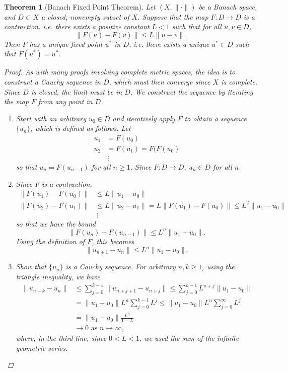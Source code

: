 \documentclass[12pt]{amsart}         %
\newtheorem{theorem}{Theorem}[section]
\theoremstyle{remark}
\begin{document}
\begin{theorem}[Banach Fixed Point Theorem] Let $(X, \|\cdot\|)$ be a Banach space, and $D \subset X$ a closed, nonempty subset of $X$. Suppose that the map $F: D \rightarrow D$ is a contraction, i.e. there exists a positive constant $L < 1$ such that for all $u, v \in D$,
\[
\|F(u) - F(v)\| \leq L\|u - v\|.
\]
Then $F$ has a unique fixed point $u^*$ in $D$, i.e. there exists a unique $u^* \in D$ such that $F(u^*) = u^*$.

\begin{proof}
As with many proofs involving complete metric spaces, the idea is to construct a Cauchy sequence in $D$, which must then converge since $X$ is complete. Since $D$ is closed, the limit must be in $D$. We construct the sequence by iterating the map $F$ from any point in $D$.

\begin{enumerate}
	\item Start with an arbitrary $u_0 \in D$ and iteratively apply $F$ to obtain a sequence $\{u_n\}$, which is defined as follows. Let
    \begin{align*}
    u_1 &= F(u_0) \\
    u_2 &= F(u_1) = F(F(u_0) \\
    &\,\vdots
    \end{align*}
    so that $u_n = F(u_{n-1})$ for all $n \geq 1$. Since $F: D \rightarrow D$, $u_n \in D$ for all $n$.
	
	\item Since $F$ is a contraction,
	\begin{align*}
	\|F(u_1) - F(u_0)\| &\leq L \|u_1 - u_0\| \\
	\|F(u_2) - F(u_1)\| &\leq L \|u_2 - u_1\| = L\|F(u_1) - F(u_0)\| \leq L^2 \|u_1 - u_0\| \\
    & \,\vdots
	\end{align*}
	so that we have the bound
	\[
	\|F(u_n) - F(u_{n-1})\| \leq L^n \|u_1 - u_0\|.
	\]
	Using the definition of $F$, this becomes
	\[
	\|u_{n+1} - u_n \| \leq L^n \|u_1 - u_0\|.
	\]
	
	\item Show that $\{ u_n \}$ is a Cauchy sequence. For arbitrary $n, k \geq 1$, using the triangle inequality, we have
	\begin{align*}
	\|u_{n+k} - u_n\| &\leq \sum_{j=0}^{k-1} \| u_{n+j+1} - u_{n+j}\|
	\leq \sum_{j=0}^{k-1} L^{n+j} \|u_1 - u_0\| \\
	&= \|u_1 - u_0\| L^n \sum_{j=0}^{k-1} L^j 
	\leq \|u_1 - u_0\| L^n \sum_{j=0}^{\infty} L^j \\
	&= \|u_1 - u_0\| \frac{L^n}{1 - L} \\
	&\rightarrow 0 \text{ as }n \rightarrow \infty,
	\end{align*}
	where, in the third line, since $0 < L < 1$, we used the sum of the infinite geometric series.
	

\end{enumerate}
\end{proof}
\end{theorem}
\end{document}
